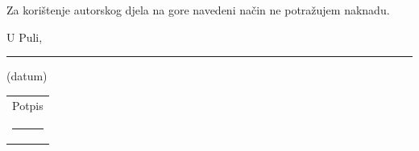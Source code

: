 Za korištenje autorskog djela na gore navedeni način ne potražujem naknadu.

\vspace{4em}
\noindent U Puli, \rule{4cm}{0.4pt} (datum)

\vspace{3em}
\begin{flushright}
\begin{tabular}{c}
Potpis \\[2.5em]
\rule{6cm}{0.4pt}
\end{tabular}
\end{flushright}
